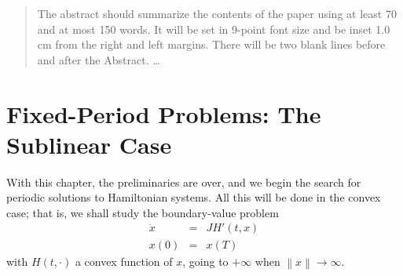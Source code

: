 \documentclass{llncs}
\begin{document}
\maketitle
%
\makeatletter
\renewenvironment{thebibliography}[1]
     {\section*{\refname}
      \small
      \list{}%
           {\settowidth\labelwidth{}%
            \leftmargin\parindent
            \itemindent=-\parindent
            \labelsep=\z@
            \if@openbib
              \advance\leftmargin\bibindent
              \itemindent -\bibindent
              \listparindent \itemindent
              \parsep \z@
            \fi
            \usecounter{enumiv}%
            \let\p@enumiv\@empty
            \renewcommand\theenumiv{}}%
      \if@openbib
        \renewcommand\newblock{\par}%
      \else
        \renewcommand\newblock{\hskip .11em \@plus.33em \@minus.07em}%
      \fi
      \sloppy\clubpenalty4000\widowpenalty4000%
      \sfcode`\.=\@m}
     {\def\@noitemerr
       {\@latex@warning{Empty `thebibliography' environment}}%
      \endlist}
      \def\@cite#1{#1}%
      \def\@lbibitem[#1]#2{\item[]\if@filesw
        {\def\protect##1{\string ##1\space}\immediate
      \write\@auxout{\string\bibcite{#2}{#1}}}\fi\ignorespaces}
\makeatother
%
\begin{abstract}
The abstract should summarize the contents of the paper
using at least 70 and at most 150 words. It will be set in 9-point
font size and be inset 1.0 cm from the right and left margins.
There will be two blank lines before and after the Abstract. \dots
{}
\end{abstract}
%
\section{Fixed-Period Problems: The Sublinear Case}
%
With this chapter, the preliminaries are over, and we begin the search
for periodic solutions to Hamiltonian systems. All this will be done in
the convex case; that is, we shall study the boundary-value problem
\begin{eqnarray*}
  \dot{x}&=&JH' (t,x)\\
  x(0) &=& x(T)
\end{eqnarray*}
with $H(t,\cdot)$ a convex function of $x$, going to $+\infty$ when
$\left\|x\right\| \to \infty$.
\end{document}
